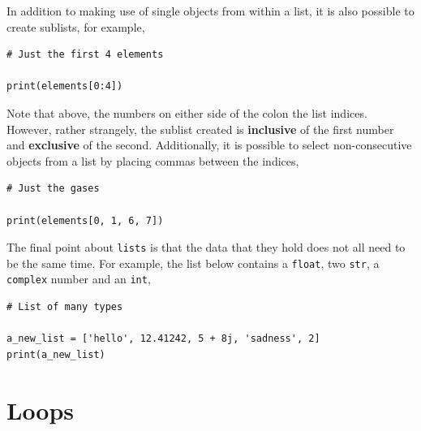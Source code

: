 \documentclass[a4paper]{article}
\begin{document}
In addition to making use of single objects from within a list, it is also possible to create sublists, for example,
\begin{lstlisting}
# Just the first 4 elements

print(elements[0:4])
\end{lstlisting}
Note that above, the numbers on either side of the colon the list indices.
However, rather strangely, the sublist created is \textbf{inclusive} of the first number and \textbf{exclusive} of the second.
Additionally, it is possible to select non-consecutive objects from a list by placing commas between the indices,
\begin{lstlisting}
# Just the gases

print(elements[0, 1, 6, 7])
\end{lstlisting}
The final point about \texttt{lists} is that the data that they hold does not all need to be the same time.
For example, the list below contains a \texttt{float}, two \texttt{str}, a \texttt{complex} number and an \texttt{int},
\begin{lstlisting}
# List of many types

a_new_list = ['hello', 12.41242, 5 + 8j, 'sadness', 2]
print(a_new_list)
\end{lstlisting}
\vspace{\baselineskip}
\begin{center}
	\noindent{}
\end{center}

\section{Loops}
\end{document}
